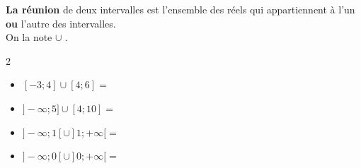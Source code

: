 \begin{Définition}
{\bf{La réunion}} de deux intervalles est l'ensemble des réels qui appartiennent à l'un {\bf{ou}} l'autre des intervalles. \\
On la note $\cup$ .
\end{Définition}

\begin{Exemples}
\leavevmode\vspace{-\baselineskip}
\vspace{-0.5cm}
\setlength{\columnsep}{2cm}
\begin{multicols}{2}
\begin{itemize}[label=\textcolor{Couleur10}{$\bullet$}]
\item $[-3\mathpunct{} ;4]\cup[4\mathpunct{} ;6]=$ \pointille{5cm}
\item $]-\infty\mathpunct{} ;5]\cup[4\mathpunct{} ;10]=$ \pointille{5cm}
\item $]-\infty\mathpunct{} ;1[\cup]1\mathpunct{} ;+\infty[=$ \pointille{5cm}
\item  $]-\infty\mathpunct{} ;0[\cup]0\mathpunct{} ;+\infty[=$ \pointille{5cm}
\end{itemize}
\end{multicols}
\end{Exemples}

